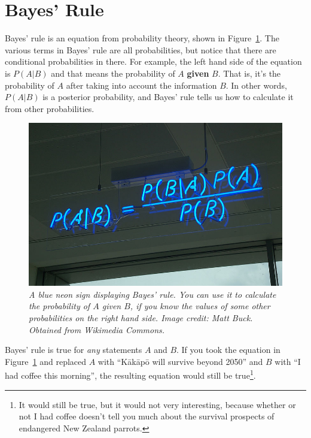 \section{Bayes' Rule}
Bayes' rule is an equation from probability theory, shown in
Figure~\ref{fig:bayes_neon}. The various terms in Bayes' rule are all
probabilities, but notice that there are conditional probabilities in there.
For example, the left hand side of the equation is $P(A|B)$ and that means
the probability of $A$ {\bf given} $B$. That is, it's the probability of $A$
after taking into account the information $B$. In other words,
$P(A|B)$ is a posterior probability, and Bayes' rule tells us how to calculate
it from other probabilities.
\begin{figure}[ht!]
\begin{center}
\includegraphics[scale=0.4]{Figures/bayes_neon.jpg}
\caption{\it A blue neon sign displaying Bayes' rule.
You can use it to calculate the probability of $A$ {\it given} $B$,
if you know the values of some other probabilities on the right hand side.
Image credit: Matt Buck. Obtained from Wikimedia Commons.
\label{fig:bayes_neon}}
\end{center}
\end{figure}
Bayes' rule is true for {\it any} statements $A$ and $B$. If you took the
equation in Figure~\ref{fig:bayes_neon} and replaced $A$ with
``K\={a}k\={a}p\={o} will survive beyond 2050'' and $B$ with
``I had coffee this morning'', the
resulting equation would still be true\footnote{It would still be true, but
it would not very interesting,
because
whether or not I had coffee doesn't tell you much about the survival prospects
of endangered New Zealand parrots.}.

